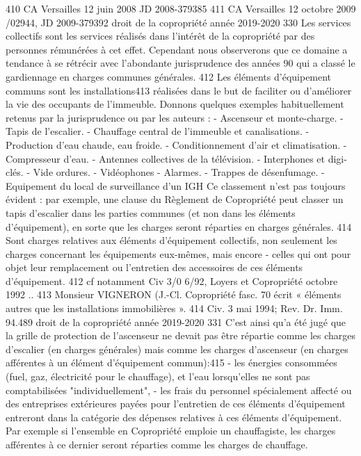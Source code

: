 		410 CA Versailles 12 juin 2008 JD 2008-379385
		411 CA Versailles 12 octobre 2009 /02944, JD 2009-379392
		droit de la copropriété année 2019-2020
		330
		Les services collectifs sont les services réalisés dans l'intérêt de la copropriété par des personnes rémunérées à cet effet. Cependant nous observerons que ce domaine a tendance à se rétrécir avec l'abondante jurisprudence des années 90 qui a classé le gardiennage en charges communes générales. 412
		Les éléments d'équipement communs sont les installations413 réalisées dans le but de faciliter ou d'améliorer la vie des occupants de l'immeuble.
		Donnons quelques exemples habituellement retenus par la jurisprudence ou par les auteurs :
		- Ascenseur et monte-charge.
		- Tapis de l'escalier.
		- Chauffage central de l'immeuble et canalisations.
		- Production d’eau chaude, eau froide.
		- Conditionnement d'air et climatisation.
		- Compresseur d'eau.
		- Antennes collectives de la télévision.
		- Interphones et digi-clés.
		- Vide ordures.
		- Vidéophones
		- Alarmes.
		- Trappes de désenfumage.
		- Equipement du local de surveillance d'un IGH
		Ce classement n'est pas toujours évident : par exemple, une clause du Règlement de Copropriété peut classer un tapis d'escalier dans les parties communes (et non dans les éléments d'équipement), en sorte que les charges seront réparties en charges générales. 414
		Sont charges relatives aux éléments d'équipement collectifs, non seulement les charges concernant les équipements eux-mêmes, mais encore
		- celles qui ont pour objet leur remplacement ou l'entretien des accessoires de ces éléments d'équipement.
		412 cf notamment Civ 3/0 6/92, Loyers et Copropriété octobre 1992 ..
		413 Monsieur VIGNERON (J.-Cl. Copropriété fasc. 70  écrit « éléments autres que les installations immobilières ».
		414 Civ. 3 mai 1994; Rev. Dr. Imm. 94.489
		droit de la copropriété année 2019-2020
		331
		C'est ainsi qu'a été jugé que la grille de protection de l'ascenseur ne devait pas être répartie comme les charges d'escalier (en charges générales) mais comme les charges d'ascenseur (en charges afférentes à un élément d'équipement commun):415
		- les énergies consommées (fuel, gaz, électricité pour le chauffage), et l'eau lorsqu'elles ne sont pas comptabilisées "individuellement",
		- les frais du personnel spécialement affecté ou des entreprises extérieures payées pour l'entretien de ces éléments d'équipement entreront dans la catégorie des dépenses relatives à ces éléments d'équipement.
		Par exemple si l'ensemble en Copropriété emploie un chauffagiste, les charges afférentes à ce dernier seront réparties comme les charges de chauffage.
	

